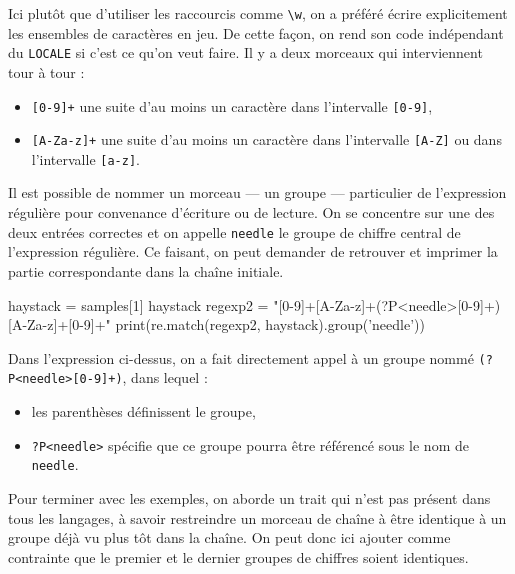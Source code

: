 Ici plutôt que d'utiliser les raccourcis comme \lstinline[basicstyle={\small\shellttfont}]{\w}, on a préféré écrire explicitement les ensembles de caractères en jeu. De cette façon, on rend son code indépendant du \texttt{LOCALE} si c'est ce qu'on veut faire. Il y a deux morceaux qui interviennent tour à tour :
\begin{itemize}
\item \lstinline[basicstyle={\small\shellttfont}]{[0-9]+} une suite d'au moins un caractère dans l'intervalle \texttt{[0-9]},
\item \lstinline[basicstyle={\small\shellttfont}]{[A-Za-z]+} une suite d'au moins un caractère dans l'intervalle \texttt{[A-Z]} ou dans l'intervalle \texttt{[a-z]}.
\end{itemize}

Il est possible de nommer un morceau --- un groupe --- particulier de l'expression régulière pour convenance d'écriture ou de lecture. On se concentre sur une des deux entrées correctes et on appelle \texttt{needle} le groupe de chiffre central de l'expression régulière. Ce faisant, on peut demander de retrouver et imprimer la partie correspondante dans la chaîne initiale.

\begin{idleconsole}
	\begin{pyconsole}
haystack = samples[1]
haystack
regexp2 = "[0-9]+[A-Za-z]+(?P<needle>[0-9]+)[A-Za-z]+[0-9]+"
print(re.match(regexp2, haystack).group('needle'))
\end{pyconsole}
\end{idleconsole}

Dans l'expression ci-dessus, on a fait directement appel à un groupe nommé \lstinline[basicstyle={\small\shellttfont}]{(?P<needle>[0-9]+)}, dans lequel :
\begin{itemize}
\item les parenthèses définissent le groupe,
\item \lstinline[basicstyle={\small\shellttfont}]{?P<needle>} spécifie que ce groupe pourra être référencé sous le nom de \texttt{needle}.
\end{itemize}

Pour terminer avec les exemples, on aborde un trait qui n'est pas présent dans tous les langages, à savoir restreindre un morceau de chaîne à être identique à un groupe déjà vu plus tôt dans la chaîne. On peut donc ici ajouter comme contrainte que le premier et le dernier groupes de chiffres soient identiques.

